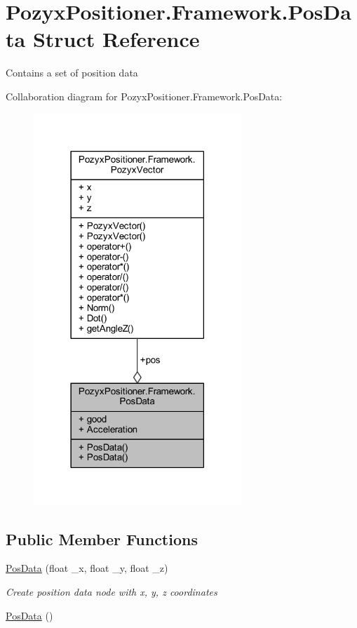 \hypertarget{struct_pozyx_positioner_1_1_framework_1_1_pos_data}{}\section{Pozyx\+Positioner.\+Framework.\+Pos\+Data Struct Reference}
\label{struct_pozyx_positioner_1_1_framework_1_1_pos_data}


Contains a set of position data  




Collaboration diagram for Pozyx\+Positioner.\+Framework.\+Pos\+Data\+:
\nopagebreak
\begin{figure}[H]
\begin{center}
\leavevmode
\includegraphics[width=222pt]{struct_pozyx_positioner_1_1_framework_1_1_pos_data__coll__graph}
\end{center}
\end{figure}
\subsection*{Public Member Functions}
\begin{DoxyCompactItemize}
\item 
\hyperlink{struct_pozyx_positioner_1_1_framework_1_1_pos_data_a3a87fee055f3468cb530c7b2cb71098f}{Pos\+Data} (float \+\_\+x, float \+\_\+y, float \+\_\+z)
\begin{DoxyCompactList}\small\item\em Create position data node with x, y, z coordinates \end{DoxyCompactList}\item 
\hyperlink{struct_pozyx_positioner_1_1_framework_1_1_pos_data_a64e8729e24ab5a33163b8a254a4fb618}{Pos\+Data} ()
\end{DoxyCompactItemize}
